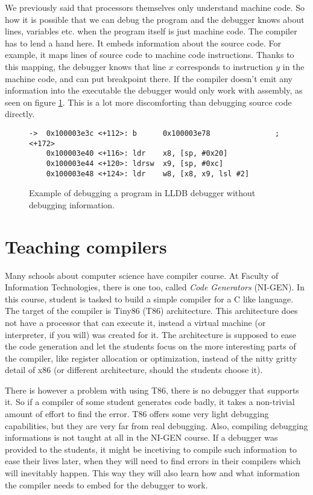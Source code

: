 We previously said that processors themselves only understand machine code. So how it is possible that we can debug the program and the debugger knows about lines, variables etc. when the program itself is just machine code. The compiler has to lend a hand here. It embeds information about the source code. For example, it maps lines of source code to machine code instructions. Thanks to this mapping, the debugger knows that line $x$ corresponds to instruction $y$ in the machine code, and can put breakpoint there.
If the compiler doesn't emit any information into the executable the debugger would only work with assembly, as seen on figure \ref{fig:lldb-debug2}. This
is a lot more discomforting than debugging source code directly.

\begin{figure}\label{fig:lldb-debug2}
\begin{lstlisting}
->  0x100003e3c <+112>: b      0x100003e78               ; <+172>
    0x100003e40 <+116>: ldr    x8, [sp, #0x20]
    0x100003e44 <+120>: ldrsw  x9, [sp, #0xc]
    0x100003e48 <+124>: ldr    w8, [x8, x9, lsl #2]
\end{lstlisting}
\caption{Example of debugging a program in LLDB debugger without debugging information.}
\end{figure}

\section{Teaching compilers}
Many schools about computer science have compiler course. At Faculty of Information Technologies, there is one too, called \textit{Code Generators} (NI-GEN). In this course, student is tasked to build a simple compiler for a C like language. The target of the compiler is Tiny86 (T86) architecture. This architecture  does not have a processor that can execute it, instead a virtual machine (or interpreter, if you will) was created for it. The architecture is supposed to ease the code generation and let the students focus on the more interesting parts of the compiler, like register allocation or optimization, instead of the nitty gritty detail of x86 (or different architecture, should the students choose it).

There is however a problem with using T86, there is no debugger that supports it. So if a compiler of some student generates code badly, it takes a non-trivial amount of effort to find the error. T86 offers some very light debugging capabilities, but they are very far from real debugging. Also, compiling debugging informations is not taught at all in the NI-GEN course. If a debugger was provided to the students, it might be incetiving to compile such information to ease their lives later, when they will need to find errors in their compilers which will inevitably happen. This way they will also learn how and what information the compiler needs to embed for the debugger to work.

